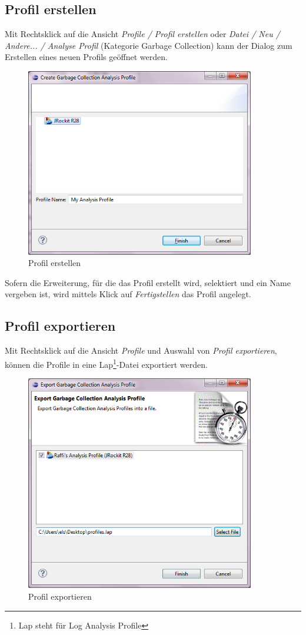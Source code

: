 \subsection*{Profil erstellen}
Mit Rechtsklick auf die Ansicht \textit{Profile / Profil erstellen} oder \textit{Datei / Neu / Andere... / Analyse Profil} (Kategorie Garbage Collection) kann der Dialog zum Erstellen eines neuen Profils geöffnet werden. 
 \begin{figure}[H]
  	\centering
    	\includegraphics[width=10cm]{images/tutorial_newprofile}
        	\caption{Profil erstellen}
\end{figure}
Sofern die Erweiterung, für die das Profil erstellt wird, selektiert und ein Name vergeben ist, wird mittels Klick auf \textit{Fertigstellen} das Profil angelegt.

\subsection*{Profil exportieren}
Mit Rechtsklick auf die Ansicht \textit{Profile} und Auswahl von \textit{Profil exportieren}, können die Profile in eine Lap\footnote{Lap steht für Log Analysis Profile}-Datei exportiert werden.
 \begin{figure}[H]
  	\centering
    	\includegraphics[width=10cm]{images/tutorial_exportprofile}
        	\caption{Profil exportieren}
\end{figure}

